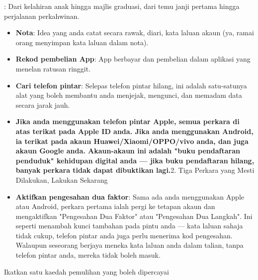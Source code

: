 


: Dari kelahiran anak hingga majlis graduasi, dari temu janji pertama hingga perjalanan perkahwinan.

\begin{itemize}
  \item \textbf{Nota}: Idea yang anda catat secara rawak, diari, kata laluan akaun (ya, ramai orang menyimpan kata laluan dalam nota).
  \item \textbf{Rekod pembelian App}: App berbayar dan pembelian dalam aplikasi yang menelan ratusan ringgit.
  \item \textbf{Cari telefon pintar}: Selepas telefon pintar hilang, ini adalah satu-satunya alat yang boleh membantu anda menjejak, mengunci, dan memadam data secara jarak jauh.
  \item \textbf{Jika anda menggunakan telefon pintar Apple, semua perkara di atas terikat pada Apple ID anda. Jika anda menggunakan Android, ia terikat pada akaun Huawei/Xiaomi/OPPO/vivo anda, dan juga akaun Google anda. Akaun-akaun ini adalah "buku pendaftaran penduduk" kehidupan digital anda — jika buku pendaftaran hilang, banyak perkara tidak dapat dibuktikan lagi.}2. Tiga Perkara yang Mesti Dilakukan, Lakukan Sekarang
  \item \textbf{Aktifkan pengesahan dua faktor}: Sama ada anda menggunakan Apple atau Android, perkara pertama ialah pergi ke tetapan akaun dan mengaktifkan "Pengesahan Dua Faktor" atau "Pengesahan Dua Langkah". Ini seperti menambah kunci tambahan pada pintu anda — kata laluan sahaja tidak cukup, telefon pintar anda juga perlu menerima kod pengesahan. Walaupun seseorang berjaya meneka kata laluan anda dalam talian, tanpa telefon pintar anda, mereka tidak boleh masuk.
\end{itemize}

Ikatkan satu kaedah pemulihan yang boleh dipercayai

